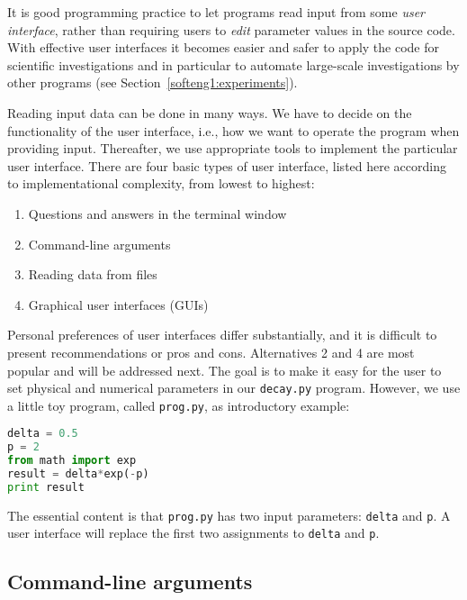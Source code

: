 \documentclass[graybox,sectrefs,envcountresetchap,open=right,final]{svmonodo}
\begin{document}
It is good programming practice to let programs read input from
some \emph{user interface}, rather than requiring users to \emph{edit}
parameter values in the source code. With effective user interfaces
it becomes easier and safer to apply the code for scientific investigations and
in particular to automate large-scale investigations by other programs
(see Section~\ref{softeng1:experiments}).

Reading input data can be done in many ways. We have to decide on the
functionality of the user interface, i.e., how we want to operate the
program when providing input. Thereafter, we use appropriate tools to
implement the particular user interface. There are four basic types
of user interface, listed here according to implementational
complexity, from lowest to highest:

\begin{enumerate}
\item Questions and answers in the terminal window

\item Command-line arguments

\item Reading data from files

\item Graphical user interfaces (GUIs)
\end{enumerate}

\noindent
Personal preferences of user interfaces differ substantially, and it is
difficult to present recommendations or pros and cons.
Alternatives 2 and 4 are most popular and will be addressed next.
The goal is to make it easy for the user to
set physical and numerical parameters in
our \texttt{decay.py} program. However, we use  a little toy program, called
\texttt{prog.py}, as introductory
example:

\begin{lstlisting}[language=Python,style=blue1bar_bluegreen]
delta = 0.5
p = 2
from math import exp
result = delta*exp(-p)
print result
\end{lstlisting}
The essential content is that \texttt{prog.py} has two input parameters: \texttt{delta}
and \texttt{p}. A user interface will replace the first two assignments to
\texttt{delta} and \texttt{p}.

\subsection{Command-line arguments}
\label{softeng1:basic:UI:cmlargs}
\end{document}
